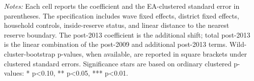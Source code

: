 \begin{table}[!htbp]
\begin{minipage}{0.98\textwidth}
\footnotesize \textit{Notes:} Each cell reports the coefficient and the EA-clustered standard error in parentheses. The specification includes wave fixed effects, district fixed effects, household controls, inside-reserve status, and linear distance to the nearest reserve boundary. The post-2013 coefficient is the additional shift; total post-2013 is the linear combination of the post-2009 and additional post-2013 terms. Wild-cluster-bootstrap p-values, when available, are reported in square brackets under clustered standard errors. Significance stars are based on ordinary clustered p-values: * p<0.10, ** p<0.05, *** p<0.01.
\end{minipage}
\end{table}

